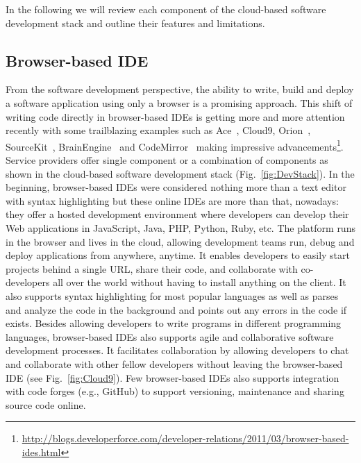 \documentclass[11pt,fleqn,twoside]{article}
\begin{document}
In the following we will review each component of the cloud-based software development stack and outline their features and limitations.

\subsection{Browser-based IDE} \label{sec:ides}

From the software development perspective, the ability to write, build and deploy a software application using only a browser is a promising approach. This shift of writing code directly in browser-based IDEs is getting more and more attention recently with some trailblazing examples such as Ace~\cite{ace_url}, Cloud9, Orion~\cite{orion_url}, SourceKit~\cite{sourcekit_url}, BrainEngine~\cite{brainengine_url} and CodeMirror~\cite{codemirror_url} making impressive advancements\footnote{\url{http://blogs.developerforce.com/developer-relations/2011/03/browser-based-ides.html}}. Service providers offer single component or a combination of components as shown in the cloud-based software development stack (Fig.~\ref{fig:DevStack}). In the beginning, browser-based IDEs were considered nothing more than a text editor with syntax highlighting but these online IDEs are more than that, nowadays: they offer a hosted development environment where developers can develop their Web applications in JavaScript, Java, PHP, Python, Ruby, etc. The platform runs in the browser and lives in the cloud, allowing development teams run, debug and deploy applications from anywhere, anytime. It enables developers to easily start projects behind a single URL, share their code, and collaborate with co-developers all over the world without having to install anything on the client. It also supports syntax highlighting for most popular languages as well as parses and analyze the code in the background and points out any errors in the code if exists. Besides allowing developers to write programs in different programming languages, browser-based IDEs also supports agile and collaborative software development processes. It facilitates collaboration by allowing developers to chat and collaborate with other fellow developers without leaving the browser-based IDE (see Fig.~\ref{fig:Cloud9}). Few browser-based IDEs also supports integration with code forges (e.g., GitHub) to support versioning, maintenance and sharing source code online.
\end{document}
